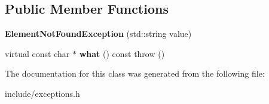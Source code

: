 \subsection*{Public Member Functions}
\begin{DoxyCompactItemize}
\item 
\hypertarget{class_element_not_found_exception_ad21e23268542ce1670189a97ac9a355d}{{\bfseries Element\+Not\+Found\+Exception} (std\+::string value)}\label{class_element_not_found_exception_ad21e23268542ce1670189a97ac9a355d}

\item 
\hypertarget{class_element_not_found_exception_a96cadc7c34010e185b32d230974b4f40}{virtual const char $\ast$ {\bfseries what} () const   throw ()}\label{class_element_not_found_exception_a96cadc7c34010e185b32d230974b4f40}

\end{DoxyCompactItemize}


The documentation for this class was generated from the following file\+:\begin{DoxyCompactItemize}
\item 
include/exceptions.\+h\end{DoxyCompactItemize}

